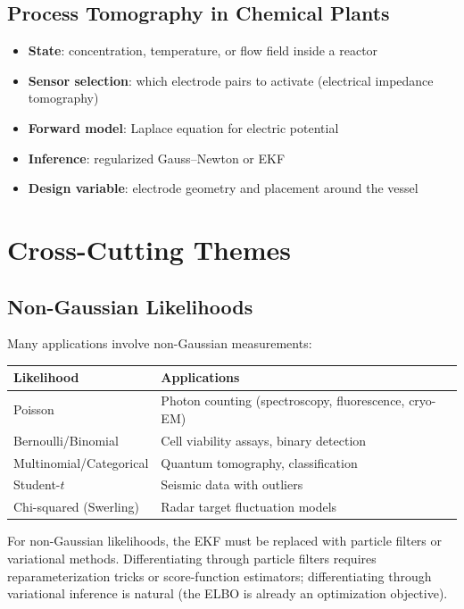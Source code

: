 \documentclass[11pt,a4paper]{article}
\begin{document}
\subsection{Process Tomography in Chemical Plants}

\begin{itemize}[nosep]
  \item \textbf{State}: concentration, temperature, or flow field inside a reactor
  \item \textbf{Sensor selection}: which electrode pairs to activate (electrical impedance tomography)
  \item \textbf{Forward model}: Laplace equation for electric potential
  \item \textbf{Inference}: regularized Gauss--Newton or EKF
  \item \textbf{Design variable}: electrode geometry and placement around the vessel
\end{itemize}

\section{Cross-Cutting Themes}

\subsection{Non-Gaussian Likelihoods}

Many applications involve non-Gaussian measurements:
\begin{center}
\begin{tabular}{@{}ll@{}}
\toprule
Likelihood & Applications \\
\midrule
Poisson & Photon counting (spectroscopy, fluorescence, cryo-EM) \\
Bernoulli/Binomial & Cell viability assays, binary detection \\
Multinomial/Categorical & Quantum tomography, classification \\
Student-$t$ & Seismic data with outliers \\
Chi-squared (Swerling) & Radar target fluctuation models \\
\bottomrule
\end{tabular}
\end{center}

For non-Gaussian likelihoods, the EKF must be replaced with particle filters or variational methods.  Differentiating through particle filters requires reparameterization tricks or score-function estimators; differentiating through variational inference is natural (the ELBO is already an optimization objective).
\end{document}
